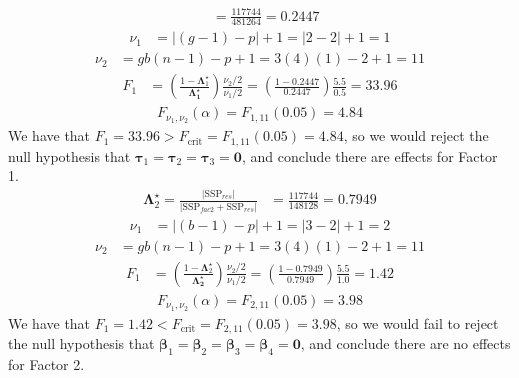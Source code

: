\begin{enumerate}[label= (\alph*)]
\begin{align*}
        & =
        \frac{117744}{481264}
        =
        0.2447
    \end{align*}
    \begin{align*}
        \nu_{1}
        & =
        |(g-1) - p| + 1 = |2 - 2| + 1 = 1
    \end{align*}
    \begin{align*}
        \nu_{2}
        & =
        gb(n-1) - p + 1 = 3(4)(1) - 2 + 1 = 11
    \end{align*}
    \begin{align*}
        F_{1}
        & =
        \left(\frac{1 - \bm{\Lambda}_{1}^{\star}}{\bm{\Lambda_{1}^{\star}}}\right)\frac{\nu_{2}/2}{\nu_{1}/2}
        =
        \left(\frac{1 - 0.2447}{0.2447}\right)\frac{5.5}{0.5}
        =
        33.96
    \end{align*}
    \begin{align*}
        F_{\nu_{1}, \nu_{2}}(\alpha)
        =
        F_{1, 11}(0.05)
        =
        4.84
    \end{align*}
    We have that $F_{1} = 33.96 > F_{\text{crit}} = F_{1, 11}(0.05) = 4.84$, so we would reject the null hypothesis that $\bm{\tau}_{1}=\bm{\tau}_{2}=\bm{\tau}_{3}=\textbf{0}$, and conclude there are effects for Factor 1.
    \begin{align*}
        \bm{\Lambda}_{2}^{\star} = \frac{|\text{SSP}_{res}|}{|\text{SSP}_{fac2} + \text{SSP}_{res}|}
        & =
        \frac{117744}{148128}
        =
        0.7949
    \end{align*}
    \begin{align*}
        \nu_{1}
        & =
        |(b-1) - p| + 1 = |3 - 2| + 1 = 2
    \end{align*}
    \begin{align*}
        \nu_{2}
        & =
        gb(n-1) - p + 1 = 3(4)(1) - 2 + 1 = 11
    \end{align*}
    \begin{align*}
        F_{1}
        & =
        \left(\frac{1 - \bm{\Lambda}_{2}^{\star}}{\bm{\Lambda_{2}^{\star}}}\right)\frac{\nu_{2}/2}{\nu_{1}/2}
        =
        \left(\frac{1 - 0.7949}{0.7949}\right)\frac{5.5}{1.0}
        =
        1.42
    \end{align*}
    \begin{align*}
        F_{\nu_{1}, \nu_{2}}(\alpha)
        =
        F_{2, 11}(0.05)
        =
        3.98
    \end{align*}
    We have that $F_{1} = 1.42 < F_{\text{crit}} = F_{2, 11}(0.05) = 3.98$, so we would fail to reject the null hypothesis that $\bm{\beta}_{1}=\bm{\beta}_{2}=\bm{\beta}_{3}=\bm{\beta}_{4}=\textbf{0}$, and conclude there are no effects for Factor 2.


\end{enumerate}
